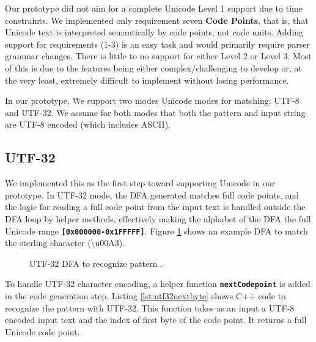 Our prototype did not aim for a complete Unicode Level 1 support due to time constraints. We implemented only requirement seven \textbf{Code Points}, that is, that Unicode text is interpreted semantically by code points, not code units. Adding support for requirements (1-3) is an easy task and would primarily require parser grammar changes. There is little to no support for either Level 2 or Level 3. Most of this is due to the features being either complex/challenging to develop or, at the very least, extremely difficult to implement without losing performance.

In our prototype, We support two modes Unicode modes for matching: UTF-8 and UTF-32. We assume for both modes that both the pattern and input string are UTF-8 encoded (which includes ASCII).

\subsection{UTF-32}
We implemented this as the first step toward supporting Unicode in our prototype. 
In UTF-32 mode, the DFA generated matches full code points, and the logic for reading a full code point from the input text is handled outside the DFA loop by helper methods, effectively making the alphabet of the DFA the full Unicode range \texttt{\textbf{[0x000000-0x1FFFFF]}}. Figure \ref{fig:utf32exdfa} shows an example DFA to match the sterling character \texttt{\textbf{\textsterling}} (\textbackslash u00A3).

\begin{figure}[H]
\centering
\usetikzlibrary{fit}
\caption[DFA to recognize pattern \texttt{\textsterling}]{UTF-32 DFA to recognize pattern \texttt{\textsterling}.}
\label{fig:utf32exdfa}
\end{figure}

To handle UTF-32 character encoding, a helper function \texttt{\textbf{nextCodepoint}} is added in the code generation step. Listing \ref{lst:utf32nextbyte} shows C++ code to recognize the pattern \texttt{\textbf{\textsterling}} with UTF-32. This function takes as an input a UTF-8 encoded input text and the index of first byte of the code point. It returns a full Unicode code point.

